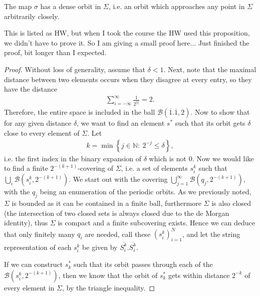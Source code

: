 \begin{proposition}[]
	The map $\sigma$ has a dense orbit in $\Sigma$, i.e. an orbit which approaches any point in $\Sigma$ arbitrarily closely.
\end{proposition}
{\color{blue} This is listed as HW, but when I took the course the HW used this proposition, we didn't have to prove it. So I am giving a small proof here... Just finished the proof, bit longer than I expected.}
\begin{proof}
Without loss of generality, assume that $\delta<1$. Next, note that the maximal distance between two elements occurs when they disagree at every entry, so they have the distance
\begin{align}
	\sum_{i=-\infty }^{\infty } \frac{1}{2^{|i|}} = 2.
\end{align}
Therefore, the entire space is included in the ball $\mathcal{B}\left( \overline{1}\bm{.} \overline{1}, 2\right)$. Now to show that for any given distance $\delta $, we want to find an element $s^{*}$ such that its orbit gets $\delta$ close to every element of $\Sigma$. Let 
\begin{align}
k = \min \left\{ j \in \mathbb{N}:\ 2^{-j}\leq \delta\right\},
\end{align}
i.e. the first index in the binary expansion of $\delta$ which is not $0$. Now we would like to find a finite $2^{-(k+1)}$-covering of $\Sigma$, i.e. a set of elements $s_i^{k}$ such that $\bigcup_{i}\mathcal{B}\left(s_i^{k}, 2^{-(k+1)}\right)$. We start out with the covering $\bigcup_{j=1}^{\infty }\mathcal{B}\left(q_j, 2^{-(k+1)}\right)$, with the $q_j$ being an enumeration of the periodic orbits. As we previously noted, $\Sigma$ is bounded as it can be contained in a finite ball, furthermore $\Sigma$ is also closed (the intersection of two closed sets is always closed due to the de Morgan identity), thus $\Sigma$ is compact and a finite subcovering exists. Hence we can deduce that only finitely many $q_i$ are needed, call these $\left(s_i^{k}\right)_{i=1}^{N}$, and let the string representation of each $s_{i}^{k}$ be given by $\overline{S_{i}^{k}}\bm{.} \overline{S_{i}^{k}}$. 

If we can construct $s_{k}^{*}$ such that its orbit passes through each of the $\mathcal{B}\left(s_i^{k}, 2^{-(k+1)}\right)$, then we know that the orbit of $s_{k}^{*}$ gets within distance $2^{-k}$ of every element in $\Sigma$, by the triangle inequality. 


\end{proof}
